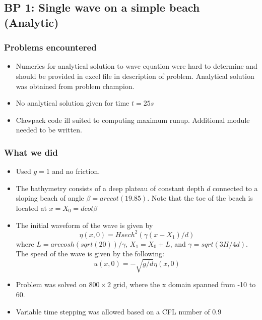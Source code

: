 \newsection
\subsection{BP 1:
  Single wave on a simple beach (Analytic)}


\subsubsection{Problems encountered}

\begin{itemize}
\item Numerics for analytical solution to wave equation were hard to determine and should be provided in excel file in description of problem. Analytical solution was obtained from problem champion.
\item No analytical solution given for time $t = 25s$
\item Clawpack code ill suited to computing maximum runup. Additional module needed to be written. 
\end{itemize}

\subsubsection{What we did}

\begin{itemize}
\item Used $g=1$ and no friction.
\item The bathymetry consists of a deep plateau of constant depth $d$ connected to a sloping beach of angle $\beta = arccot(19.85)$. Note that the toe of the beach is located at $x = X_0 = d cot \beta$
\item The initial waveform of the wave is given by 
\begin{equation}
\eta(x,0) = H sech^2(\gamma (x - X_1)/d)
\end{equation}
where $L = arccosh(sqrt(20))/\gamma$, $X_1 = X_0 + L$, and $\gamma = sqrt(3H/4d)$. The speed of the wave is given by the following: 
\begin{equation}
u(x,0)=-\sqrt{g/d}\eta(x,0)
\end{equation}
\item Problem was solved on $800\times 2$ grid, where the x domain spanned from -10 to 60.
\item Variable time stepping was allowed based on a CFL number of 0.9
\end{itemize} 

